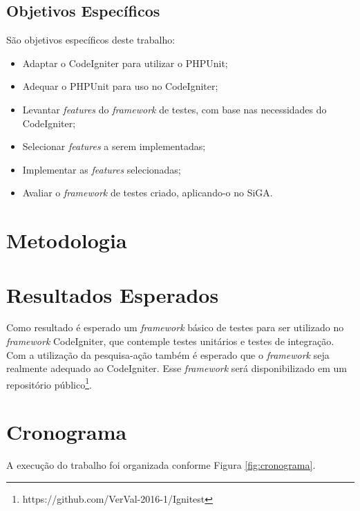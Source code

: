 \subsection{Objetivos Específicos}

São objetivos específicos deste trabalho:

\begin{itemize}
 \item Adaptar o CodeIgniter para utilizar o PHPUnit;
 \item Adequar o PHPUnit para uso no CodeIgniter;
 \item Levantar \textit{features} do \textit{framework} de testes, com base nas necessidades do CodeIgniter;
 \item Selecionar \textit{features} a serem implementadas;
 \item Implementar as \textit{features} selecionadas;
 \item Avaliar o \textit{framework} de testes criado, aplicando-o no SiGA.
\end{itemize}


\section{Metodologia}

  

\section{Resultados Esperados}

Como resultado é esperado um \textit{framework} básico de testes para ser utilizado no \textit{framework} CodeIgniter, que contemple
testes unitários e testes de integração. Com a utilização da pesquisa-ação também é esperado que o \textit{framework} seja realmente adequado
ao CodeIgniter. Esse \textit{framework} será disponibilizado em um repositório público\footnote{https://github.com/VerVal-2016-1/Ignitest}.

\section{Cronograma}

A execução do trabalho foi organizada conforme Figura \ref{fig:cronograma}.

